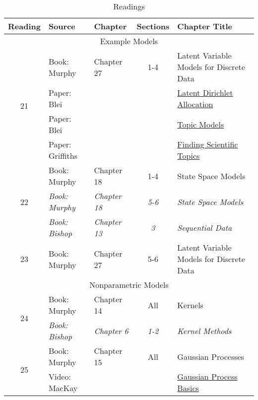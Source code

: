 \documentclass[12pt]{article}
\begin{document}
{    \begin{table}
    \caption{Readings}
    \label{table:readings3}
    \begin{center}
        \begin{tabular}{| c | l | l | c | p{6 cm} |}
            \hline
            Reading & Source & Chapter & Sections & Chapter Title \\
            \hline
            \multicolumn{5}{|c|}{Example Models} \\
            \hline
            \multirow{4}{*}{21} & Book: Murphy & Chapter 27 & 1-4 & Latent Variable Models for Discrete Data \\
                                & Paper: Blei &  &  & \href{http://web-static-aws.seas.harvard.edu/courses/cs281/papers/blei-ng-jordan-2003.pdf}{Latent Dirichlet Allocation} \\
                                & Paper: Blei &  &  & \href{http://web-static-aws.seas.harvard.edu/courses/cs281/papers/blei-lafferty-2009.pdf}{Topic Models} \\
                                & Paper: Griffiths &  &  & \href{http://web-static-aws.seas.harvard.edu/courses/cs281/papers/griffiths-steyvers-2004.pdf}{Finding Scientific Topics} \\
            \hline
            \multirow{3}{*}{22} & Book: Murphy & Chapter 18 & 1-4 & State Space Models \\
                               & \textit{Book: Murphy} & \textit{Chapter 18} & \textit{5-6} & \textit{State Space Models} \\
                               & \textit{Book: Bishop} & \textit{Chapter 13} & \textit{3} & \textit{Sequential Data} \\
            \hline
            \multirow{1}{*}{23} & Book: Murphy & Chapter 27 & 5-6 & Latent Variable Models for Discrete Data \\
            \hline
            \multicolumn{5}{|c|}{Nonparametric Models} \\
            \hline
            \multirow{2}{*}{24} & Book: Murphy & Chapter 14 & All & Kernels \\
                               & \textit{Book: Bishop} & \textit{Chapter 6} & \textit{1-2} & \textit{Kernel Methods} \\
            \hline
            \multirow{3}{*}{25} & Book: Murphy & Chapter 15 & All & Gaussian Processes \\
                               & Video: MacKay &  &  & \href{http://videolectures.net/gpip06_mackay_gpb/}{Gaussian Process Basics} \\

\end{tabular}
\end{center}
\end{table}}
\end{document}
